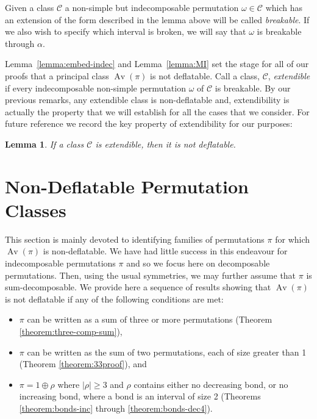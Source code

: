 \documentclass[10pt]{article}
\theoremstyle{plain}
\newtheorem{lemma}[theorem]{Lemma}
\newcommand{\Av}{\operatorname{Av}}
\newcommand{\C}{\mathcal{C}}
\begin{document}
Given a class $\C$ a non-simple but indecomposable permutation $\omega \in \C$ which has an extension of the form described in the lemma above will be called \emph{breakable}. If we also wish to specify which interval is broken, we will say that $\omega$ is breakable through $\alpha$.

Lemma~\ref{lemma:embed-indec} and Lemma~\ref{lemma:MI} set the stage for all of our proofs that a principal class $\Av(\pi)$ is not deflatable. Call a class, $\C$, \emph{extendible} if every indecomposable non-simple permutation $\omega$ of $\C$ is breakable. By our previous remarks, any extendible class is non-deflatable and, extendibility is actually the property that we will establish for all the cases that we consider. For future reference we record the key property of extendibility for our purposes:

%
\begin{lemma}
	\label{lemma:extendible}
	If a class $\C$ is extendible, then it is not deflatable.
\end{lemma}

\section{Non-Deflatable Permutation Classes}
\label{section:notdef}

This section is mainly devoted to identifying families of permutations $\pi$ for which $\Av(\pi)$ is non-deflatable.  We have had little success in this endeavour for indecomposable permutations $\pi$ and so we focus here on decomposable permutations.  Then, using the usual symmetries, we may further assume that $\pi$ is sum-decomposable. We provide here a sequence of results showing that $\Av(\pi)$ is not deflatable if any of the following conditions are met:
\begin{itemize}
\item
$\pi$ can be written as a sum of three or more permutations (Theorem \ref{theorem:three-comp-sum}),
\item
$\pi$ can be written as the sum of two permutations, each of size greater than 1 (Theorem \ref{theorem:33proof}), and
\item
$\pi = 1 \oplus \rho$ where $|\rho| \geq 3$ and $\rho$ contains either no decreasing bond, or no increasing bond, where a bond is an interval of size 2 (Theorems \ref{theorem:bonds-inc} through \ref{theorem:bonds-dec4}).
\end{itemize}
\end{document}
